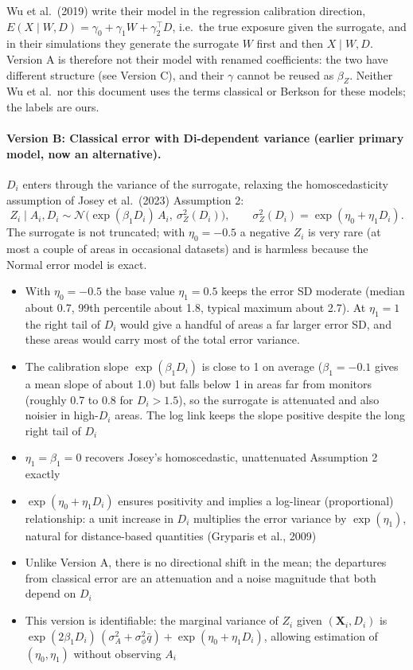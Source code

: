 \documentclass[11pt]{article}
\begin{document}
Wu et al.\ (2019) write their model in the regression calibration direction,
$E(X \mid W, D) = \gamma_0 + \gamma_1 W + \gamma_2^\top D$, i.e.\ the true exposure given the
surrogate, and in their simulations they generate the surrogate $W$ first and then $X \mid W, D$.
Version A is therefore not their model with renamed coefficients: the two have different structure
(see Version C), and their $\gamma$ cannot be reused as $\beta_Z$. Neither Wu et al.\ nor this document
uses the terms classical or Berkson for these models; the labels are ours.

\paragraph{Version B: Classical error with Di-dependent variance (earlier primary model, now an alternative).}

$D_i$ enters through the variance of the surrogate, relaxing the homoscedasticity
assumption of Josey et al.\ (2023) Assumption 2:
\begin{equation}
Z_i \mid A_i, D_i \sim \mathcal{N}\big(\exp(\beta_1 D_i)\,A_i,\ \sigma_Z^2(D_i)\big), \qquad
\sigma_Z^2(D_i) = \exp(\eta_0 + \eta_1 D_i). \label{eq:errorB}
\end{equation}
The surrogate is not truncated; with $\eta_0 = -0.5$ a negative $Z_i$ is very rare (at most a couple of
areas in occasional datasets) and is harmless because the Normal error model is exact.

\begin{itemize}
\item With $\eta_0 = -0.5$ the base value $\eta_1 = 0.5$ keeps the error SD moderate (median about
0.7, 99th percentile about 1.8, typical maximum about 2.7). At $\eta_1 = 1$ the right tail of $D_i$ would give a handful
of areas a far larger error SD, and these areas would carry most of the total error variance.
\item The calibration slope $\exp(\beta_1 D_i)$ is close to 1 on average ($\beta_1 = -0.1$ gives a
mean slope of about 1.0) but falls below 1 in areas far from monitors (roughly 0.7 to 0.8 for $D_i > 1.5$),
so the surrogate is attenuated and also noisier in high-$D_i$ areas. The log link keeps the slope
positive despite the long right tail of $D_i$
\item $\eta_1 = \beta_1 = 0$ recovers Josey's homoscedastic, unattenuated Assumption 2 exactly
\item $\exp(\eta_0 + \eta_1 D_i)$ ensures positivity and implies a log-linear
(proportional) relationship: a unit increase in $D_i$ multiplies the error variance by
$\exp(\eta_1)$, natural for distance-based quantities (Gryparis et al., 2009)
\item Unlike Version A, there is no directional shift in the mean; the departures from classical
error are an attenuation and a noise magnitude that both depend on $D_i$
\item This version is identifiable: the marginal variance of $Z_i$ given
$(\mathbf{X}_i, D_i)$ is $\exp(2\beta_1 D_i)\,(\sigma_A^2 + \sigma_\phi^2 \bar{q}) + \exp(\eta_0 + \eta_1 D_i)$,
allowing estimation of $(\eta_0, \eta_1)$ without observing $A_i$
\end{itemize}
\end{document}
